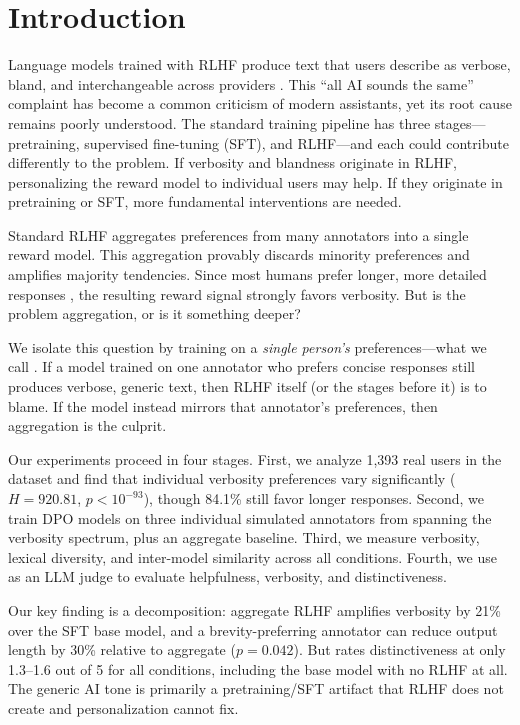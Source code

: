 \section{Introduction}
\label{sec:intro}

Language models trained with RLHF produce text that users describe as verbose, bland, and interchangeable across providers \citep{ouyang2022training, bai2022training}. This ``all AI sounds the same'' complaint has become a common criticism of modern assistants, yet its root cause remains poorly understood. The standard training pipeline has three stages---pretraining, supervised fine-tuning (SFT), and RLHF---and each could contribute differently to the problem. If verbosity and blandness originate in RLHF, personalizing the reward model to individual users may help. If they originate in pretraining or SFT, more fundamental interventions are needed.

Standard RLHF aggregates preferences from many annotators into a single reward model. This aggregation provably discards minority preferences \citep{chakraborty2024maxmin} and amplifies majority tendencies. Since most humans prefer longer, more detailed responses \citep{shen2023loose, saito2023verbosity}, the resulting reward signal strongly favors verbosity. But is the problem aggregation, or is it something deeper?

We isolate this question by training on a \emph{single person's} preferences---what we call \oneprlhf. If a model trained on one annotator who prefers concise responses still produces verbose, generic text, then RLHF itself (or the stages before it) is to blame. If the model instead mirrors that annotator's preferences, then aggregation is the culprit.

Our experiments proceed in four stages. First, we analyze 1,393 real users in the \prism dataset \citep{kirk2024prism} and find that individual verbosity preferences vary significantly ($H{=}920.81$, $p{<}10^{-93}$), though 84.1\% still favor longer responses. Second, we train DPO models \citep{rafailov2023direct} on three individual simulated annotators from \personalllm \citep{personalllm2024} spanning the verbosity spectrum, plus an aggregate baseline. Third, we measure verbosity, lexical diversity, and inter-model similarity across all conditions. Fourth, we use \gptjudge as an LLM judge to evaluate helpfulness, verbosity, and distinctiveness.

Our key finding is a decomposition: aggregate RLHF amplifies verbosity by 21\% over the SFT base model, and a brevity-preferring annotator can reduce output length by 30\% relative to aggregate ($p{=}0.042$). But \gptjudge rates distinctiveness at only 1.3--1.6 out of 5 for all conditions, including the base model with no RLHF at all. The generic AI tone is primarily a pretraining/SFT artifact that RLHF does not create and personalization cannot fix.

